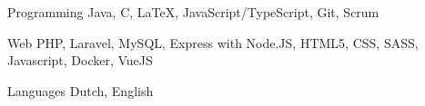 


\begin{cvskills}


\cvskill
{Programming} %
{Java, C, LaTeX, JavaScript/TypeScript, Git, Scrum} %


\cvskill
{Web} %
{PHP, Laravel, MySQL, Express with Node.JS, HTML5, CSS, SASS, Javascript, Docker, VueJS} %


\cvskill
{Languages} %
{Dutch, English} %


\end{cvskills}
